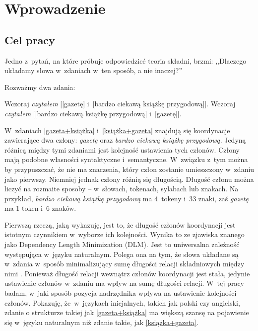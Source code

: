 \chapter{Wprowadzenie} \label{ch1}
\section{Cel pracy}

Jedno z~pytań, na które próbuje odpowiedzieć teoria składni, brzmi: ,,Dlaczego układamy słowa w~zdaniach w~ten sposób, a nie inaczej?''

Rozważmy dwa zdania:

\begin{exe}
\ex \label{gazeta+książka} Wczoraj \emph{czytałem} [[gazetę] i~[bardzo ciekawą książkę przygodową]].
\ex \label{książka+gazeta} Wczoraj \emph{czytałem} [[bardzo ciekawą książkę przygodową] i~[gazetę]].
\end{exe}

W~zdaniach \eqref{gazeta+książka} i~\eqref{książka+gazeta} znajdują się koordynacje zawierające dwa człony: \emph{gazetę} oraz \emph{bardzo ciekawą książkę przygodową}. Jedyną różnicą między tymi zdaniami jest kolejność ustawienia tych członów. Człony mają podobne własności syntaktyczne i~semantyczne. W~związku z~tym można by przypuszczać, że nie ma znaczenia, który człon zostanie umieszczony w~zdaniu jako pierwszy. Niemniej jednak człony różnią się długością. Długość członu można liczyć na rozmaite sposoby -- w~słowach, tokenach, sylabach lub znakach. Na przykład, \emph{bardzo ciekawą książkę przygodową} ma 4~tokeny i~33 znaki, zaś \emph{gazetę} ma 1 token i~6 znaków. 


Pierwszą rzeczą, jaką wykazuję, jest to, że długość członów koordynacji jest istotnym czynnikiem w~wyborze ich kolejności. Wynika to ze zjawiska znanego jako Dependency Length Minimization (DLM). Jest to uniwersalna zależność występująca w~języku naturalnym. Polega ona na tym, że słowa układane są w~zdania w~sposób minimalizujący sumę długości relacji składniowych między nimi \citep{temperley2007minimization, futrell2015large}. Ponieważ długość relacji wewnątrz członów koordynacji jest stała, jedynie ustawienie członów w~zdaniu ma wpływ na sumę długości relacji. 
W~tej pracy badam, w~jaki sposób pozycja nadrzędnika wpływa na ustawienie kolejności członów. Pokazuję, że~w~językach inicjalnych, takich jak polski czy angielski, zdanie o strukturze takiej jak \eqref{gazeta+książka} ma większą szansę na pojawienie się w~języku naturalnym niż zdanie takie, jak \eqref{książka+gazeta}.

